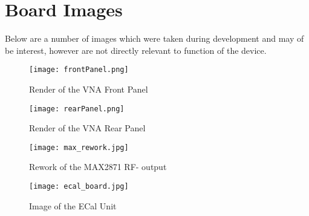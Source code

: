 \section{Board Images}
Below are a number of images which were taken during development and may of be interest, however are not directly relevant to function of the device. 

\begin{figure}[H]
	\centering
	\texttt{[image: frontPanel.png]}
	\caption{Render of the VNA Front Panel}
	\label{fig:pcb_front_render}
\end{figure}

\begin{figure}[H]
	\centering
	\texttt{[image: rearPanel.png]}
	\caption{Render of the VNA Rear Panel}
	\label{fig:pcb_rear_render}
\end{figure}

\begin{figure}[H]
	\centering
	\texttt{[image: max\_rework.jpg]}
	\caption{Rework of the MAX2871 RF- output}
	\label{fig:max_rework}
\end{figure}


\begin{figure}[H]
	\centering
	\texttt{[image: ecal\_board.jpg]}
	\caption{Image of the ECal Unit}
	\label{fig:ecal_photo}
\end{figure}